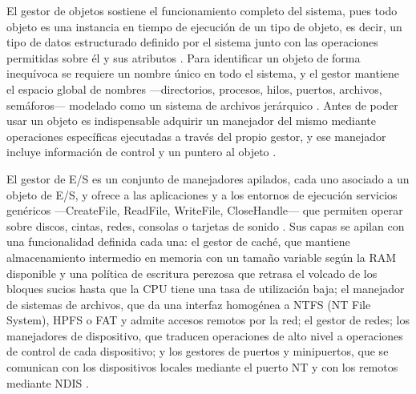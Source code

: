 \documentclass[12pt]{article}
\begin{document}
El gestor de objetos sostiene el funcionamiento completo del sistema, pues todo objeto es una instancia en tiempo de ejecución de un tipo de objeto, es decir, un tipo de datos estructurado definido por el sistema junto con las operaciones permitidas sobre él y sus atributos \parencite[\S 12.5.1, p.\ 624]{carretero2001sistemas}. Para identificar un objeto de forma inequívoca se requiere un nombre único en todo el sistema, y el gestor mantiene el espacio global de nombres ---directorios, procesos, hilos, puertos, archivos, semáforos--- modelado como un sistema de archivos jerárquico \parencite[\S 12.5.1, p.\ 625]{carretero2001sistemas}. Antes de poder usar un objeto es indispensable adquirir un manejador del mismo mediante operaciones específicas ejecutadas a través del propio gestor, y ese manejador incluye información de control y un puntero al objeto \parencite[\S 12.5.1, p.\ 625]{carretero2001sistemas}.

El gestor de E/S es un conjunto de manejadores apilados, cada uno asociado a un objeto de E/S, y ofrece a las aplicaciones y a los entornos de ejecución servicios genéricos ---CreateFile, ReadFile, WriteFile, CloseHandle--- que permiten operar sobre discos, cintas, redes, consolas o tarjetas de sonido \parencite[\S 12.5.5, p.\ 631]{carretero2001sistemas}. Sus capas se apilan con una funcionalidad definida cada una: el gestor de caché, que mantiene almacenamiento intermedio en memoria con un tamaño variable según la RAM disponible y una política de escritura perezosa que retrasa el volcado de los bloques sucios hasta que la CPU tiene una tasa de utilización baja; el manejador de sistemas de archivos, que da una interfaz homogénea a NTFS (NT File System), HPFS o FAT y admite accesos remotos por la red; el gestor de redes; los manejadores de dispositivo, que traducen operaciones de alto nivel a operaciones de control de cada dispositivo; y los gestores de puertos y minipuertos, que se comunican con los dispositivos locales mediante el puerto NT y con los remotos mediante NDIS \parencite[\S 12.5.5, p.\ 631]{carretero2001sistemas}.
\end{document}
